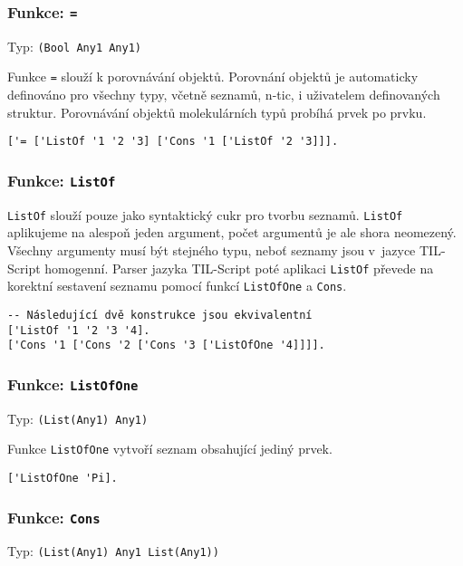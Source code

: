 \subsubsection*{Funkce: \lstinline|=|}

Typ: \lstinline{(Bool Any1 Any1)}

Funkce \lstinline{=} slouží k porovnávání objektů. Porovnání objektů je automaticky definováno
pro všechny typy, včetně seznamů, n-tic, i uživatelem definovaných struktur. Porovnávání
objektů molekulárních typů probíhá prvek po prvku.

\begin{lstlisting}[caption={Ukázka využití funkce =}]
['= ['ListOf '1 '2 '3] ['Cons '1 ['ListOf '2 '3]]].
\end{lstlisting}

\subsubsection*{Funkce: \lstinline|ListOf|}

\lstinline{ListOf} slouží pouze jako syntaktický cukr pro tvorbu seznamů. \lstinline{ListOf}
aplikujeme na alespoň jeden argument, počet argumentů je ale shora neomezený. Všechny argumenty musí
být stejného typu, neboť seznamy jsou v~jazyce TIL-Script homogenní. Parser jazyka TIL-Script poté
aplikaci \lstinline{ListOf} převede na korektní sestavení seznamu pomocí funkcí
\lstinline{ListOfOne} a \lstinline{Cons}.

\begin{lstlisting}[caption={Ukázka využití ListOf}]
-- Následující dvě konstrukce jsou ekvivalentní
['ListOf '1 '2 '3 '4].
['Cons '1 ['Cons '2 ['Cons '3 ['ListOfOne '4]]]].
\end{lstlisting}

\subsubsection*{Funkce: \lstinline|ListOfOne|}
Typ: \lstinline{(List(Any1) Any1)}

Funkce \lstinline{ListOfOne} vytvoří seznam obsahující jediný prvek.

\begin{lstlisting}[caption={Ukázka využití ListOfOne}]
['ListOfOne 'Pi].
\end{lstlisting}

\subsubsection*{Funkce: \lstinline|Cons|}
Typ: \lstinline{(List(Any1) Any1 List(Any1))}

